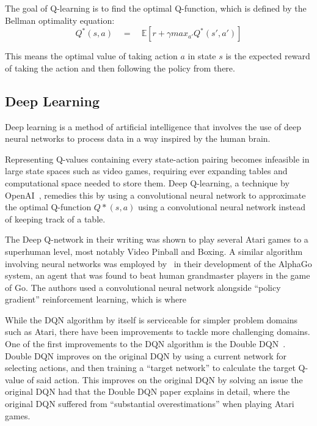 \documentclass[12pt,a4paper]{article}
\begin{document}
    The goal of Q-learning is to find the optimal Q-function, which is defined by the Bellman optimality equation:
    \[Q^{*}(s, a) \quad = \quad \mathbb{E} [r + \gamma max_{a'} Q^{*}(s', a')]\]

    This means the optimal value of taking action \(a\) in state \(s\) is the expected reward of taking the action and then following the policy from there.

    \subsection{Deep Learning}\label{subsec:deep-learning}
    Deep learning is a method of artificial intelligence that involves the use of deep neural networks to process data in a way inspired by the human brain. %
    
    Representing Q-values containing every state-action pairing becomes infeasible in large state spaces such as video
    games, requiring ever expanding tables and computational space needed to store them.
    Deep Q-learning, a technique by OpenAI~\citep{mnih15}, remedies this by using a convolutional neural network to
    approximate the optimal Q-function \(Q*(s, a)\) using a convolutional neural network instead of keeping track of
    a table.

    The Deep Q-network in their writing was shown to play several Atari games to a superhuman level, most notably Video Pinball and Boxing.
    A similar algorithm involving neural networks was employed by~\citet{silver16} in their development of the AlphaGo system, an agent that was found to beat human grandmaster players in the game of Go.
    The authors used a convolutional neural network alongside ``policy gradient'' reinforcement learning, which is where %

    While the DQN algorithm by itself is serviceable for simpler problem domains such as Atari, there have been improvements to tackle more challenging domains.
    One of the first improvements to the DQN algorithm is the Double DQN~\citep{hasselt15}.
    Double DQN improves on the original DQN by using a current network for selecting actions, and then training a ``target network''
    to calculate the target Q-value of said action.
    This improves on the original DQN by solving an issue the original DQN had that the Double DQN paper explains in detail,
    where the original DQN suffered from ``substantial overestimations'' when playing Atari games.
\end{document}
